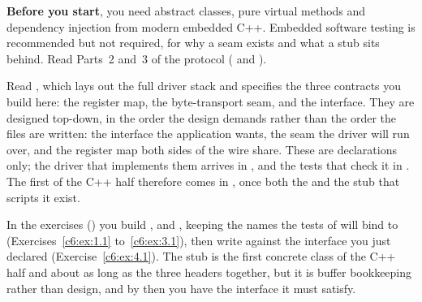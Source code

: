 \textbf{Before you start}, you need abstract classes, pure virtual methods and dependency injection
from modern embedded C++. Embedded software testing is recommended but not required, for why a seam
exists and what a stub sits behind. Read Parts~2 and~3 of the protocol ( and
).

Read , which lays out the full driver stack and specifies the three
contracts you build here: the register map, the byte-transport seam, and the interface. They are
designed top-down, in the order the design demands rather than the order the files are written: the
interface the application wants, the seam the driver will run over, and the register map both sides
of the wire share. These are declarations only; the driver that implements them arrives in
, and the tests that check it in . The first  of the C++ half
therefore comes in , once both the  and the stub that scripts it exist.

In the exercises () you build ,
 and , keeping the names the
tests of  will bind to (Exercises~\ref{c6:ex:1.1} to~\ref{c6:ex:3.1}), then write
 against the interface you just declared (Exercise~\ref{c6:ex:4.1}). The
stub is the first concrete class of the C++ half and about as long as the three headers together,
but it is buffer bookkeeping rather than design, and by then you have the interface it must satisfy.




